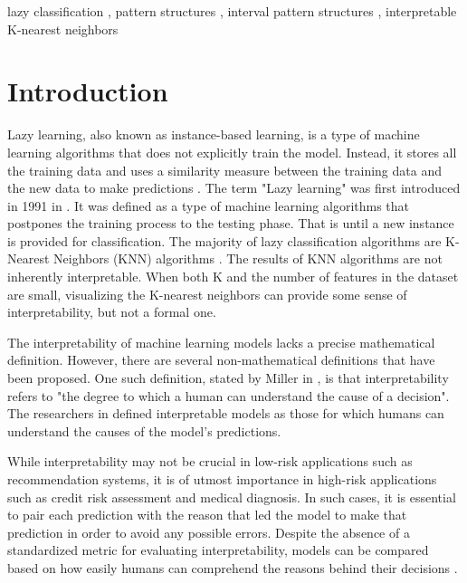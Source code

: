 \documentclass[
]{ceurart}
\begin{document}
\begin{keywords}
  lazy classification \sep
  pattern structures \sep
  interval pattern structures \sep
  interpretable K-nearest neighbors
\end{keywords}

\maketitle

\section{Introduction}
Lazy learning, also known as instance-based learning, is a type of machine learning algorithms that does not explicitly train the model. Instead, it stores all the training data and uses a similarity measure between the training data and the new data to make predictions \cite{aha1991instance}. The term "Lazy learning" was first introduced in 1991 in \cite{lowe1991learning}. It was defined as a type of machine learning algorithms that postpones the training process to the testing phase. That is until a new instance is provided for classification. The majority of lazy classification algorithms are K-Nearest Neighbors (KNN) algorithms \cite{wettschereck1997review}. The results of KNN algorithms are not inherently interpretable. When both K and the number of features in the dataset are small, visualizing the K-nearest neighbors can provide some sense of interpretability, but not a formal one.



The interpretability of machine learning models lacks a precise mathematical definition. However, there are several non-mathematical definitions that have been proposed. One such definition, stated by Miller in \cite{miller2019explanation}, is that interpretability refers to "the degree to which a human can understand the cause of a decision". The researchers in \cite{dudyrev2022human} defined interpretable models as those for which humans can understand the causes of the model's predictions. 

While interpretability may not be crucial in low-risk applications such as recommendation systems, it is of utmost importance in high-risk applications such as credit risk assessment and medical diagnosis. In such cases, it is essential to pair each prediction with the reason that led the model to make that prediction in order to avoid any possible errors. Despite the absence of a standardized metric for evaluating interpretability, models can be compared based on how easily humans can comprehend the reasons behind their decisions \cite{molnar2020interpretable}.
\end{document}
